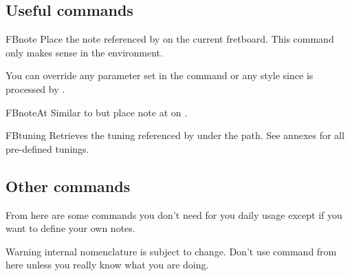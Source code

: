 \documentclass[a4paper]{article}
\begin{document}
\subsection{Useful commands}

\begin{docCommand}{FBnote}{}
  Place the note referenced by  on the current fretboard. This
  command only makes sense in the  environment.

  You can override any parameter set in the  command or
  any  style since  is processed by
  .
\end{docCommand}

\begin{docCommand}{FBnoteAt}{}
  Similar to  but place note  at 
  on .
\end{docCommand}


\begin{docCommand}{FBtuning}{}
  Retrieves the tuning referenced by  under the
   path. See annexes for all pre-defined tunings.
\end{docCommand}


\subsection{Other commands}

From here are some commands you don't need for you daily usage except if you
want to define your own notes.

\begin{tcolorbox}[warning]
Warning internal nomenclature is subject to change. Don't use command from
here unless you really know what you are doing.
\end{tcolorbox}
\end{document}
